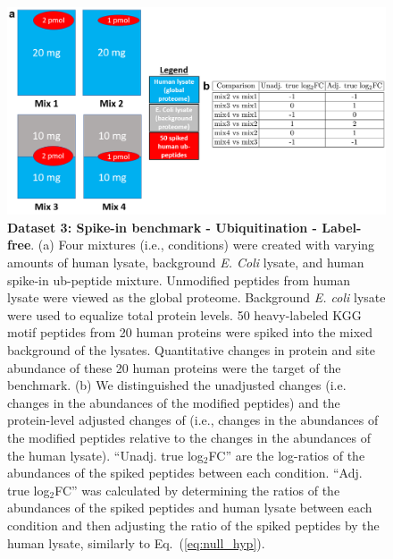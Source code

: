 \documentclass[mcp]{article}
\numberwithin{table}{section}
\def\eqref#1{Eq.~(\ref{eq:#1})}
\begin{document}

\begin{figure}[ht]
\centering
\includegraphics[scale=.5]{images/benchmark_fig.png}
\caption{{\bf Dataset 3: Spike-in benchmark - Ubiquitination - Label-free}. 
%
(a) Four mixtures (i.e., conditions) were created with varying amounts of human lysate, background {\it E. Coli} lysate, and human spike-in ub-peptide mixture. Unmodified peptides from human lysate were viewed as the global proteome. Background {\it E. coli} lysate were used to equalize total protein levels. 50 heavy-labeled KGG motif peptides from 20 human proteins were spiked into the mixed background of the lysates. Quantitative changes in protein and site abundance of these 20 human proteins were the target of the benchmark.
%
(b)  We distinguished the unadjusted changes (i.e. changes in the abundances of the modified peptides) and the protein-level adjusted changes of (i.e., changes in the abundances of the modified peptides relative to the changes in the abundances of the human lysate).   ``Unadj. true log$_2$FC'' are the log-ratios of the abundances of the spiked peptides between each condition. ``Adj. true log$_2$FC'' was calculated by determining the ratios of the abundances of the spiked peptides and human lysate between each condition and then adjusting the ratio of the spiked peptides by the human lysate, similarly to \eqref{null_hyp}.}
\label{fig:benchmark-design}
\end{figure}
\end{document}
